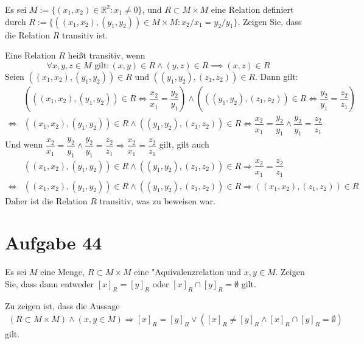 \documentclass[10pt, oneside]{article}
\begin{document}
Es sei $M := \{(x_1, x_2) \in \mathbb{R}^2 : x_1 \neq 0\}$, und $R \subset M
\times M$ eine Relation definiert durch $R := \{((x_1, x_2), (y_1, y_2)) \in M
\times M : x_2/x_1 = y_2/y_1\}$. Zeigen Sie, dass die Relation $R$ transitiv
ist.

Eine Relation $R$ hei{\ss}t transitiv, wenn
\begin{equation*}
    \forall x,y,z \in M \text{ gilt} : (x, y) \in R \land (y, z) \in R \implies (x, z) \in R
\end{equation*}
Seien $((x_1, x_2), (y_1, y_2)) \in R$ und $((y_1, y_2), (z_1, z_2)) \in R$.
Dann gilt:
\begin{align*}
    &\left(((x_1, x_2), (y_1, y_2)) \in R \Leftrightarrow \dfrac{x_2}{x_1} = \dfrac{y_2}{y_1}\right)
    \land
    \left(((y_1, y_2), (z_1, z_2)) \in R \Leftrightarrow \dfrac{y_2}{y_1} = \dfrac{z_2}{z_1}\right) \\[5pt]
    \iff&
    ((x_1, x_2), (y_1, y_2)) \in R \land ((y_1, y_2), (z_1, z_2)) \in R
    \Leftrightarrow
    \dfrac{x_2}{x_1} = \dfrac{y_2}{y_1} \land \dfrac{y_2}{y_1} = \dfrac{z_2}{z_1}
\end{align*}
Und wenn $\dfrac{x_2}{x_1} = \dfrac{y_2}{y_1} \land \dfrac{y_2}{y_1} =
\dfrac{z_2}{z_1} \Rightarrow \dfrac{x_2}{x_1} = \dfrac{z_2}{z_1}$ gilt, gilt auch
\begin{align*}
    &((x_1, x_2), (y_1, y_2)) \in R \land ((y_1, y_2), (z_1, z_2)) \in R
    \Rightarrow
    \dfrac{x_2}{x_1} = \dfrac{z_2}{z_1} \\[5pt]
    \iff&
    ((x_1, x_2), (y_1, y_2)) \in R \land ((y_1, y_2), (z_1, z_2)) \in R
    \Rightarrow
    ((x_1, x_2), (z_1, z_2)) \in R
\end{align*}
Daher ist die Relation $R$ transitiv, was zu beweisen war.

\pagebreak
\section{Aufgabe 44}

Es sei $M$ eine Menge, $R \subset M \times M$ eine "Aquivalenzrelation und $x,
y \in M$. Zeigen Sie, dass dann entweder $[x]_R = [y]_R$ oder $[x]_R \cap [y]_R
= \emptyset$ gilt.

Zu zeigen ist, dass die Aussage
\begin{align*}
    (R \subset M \times M) \land (x, y \in M) \Rightarrow [x]_R = [y]_R \lor ([x]_R \neq [y]_R \land [x]_R \cap [y]_R = \emptyset)
\end{align*}
gilt.
\end{document}
